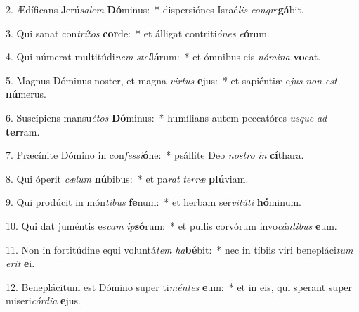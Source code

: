 2. Ædíficans Jerú\textit{sa}\textit{lem} \textbf{Dó}minus:~*  dispersiónes Israé\textit{lis} \textit{con}\textit{gre}\textbf{gá}bit.\

3. Qui sanat con\textit{trí}\textit{tos} \textbf{cor}de:~*  et álligat contriti\textit{ó}\textit{nes} \textit{e}\textbf{ó}rum.\

4. Qui númerat multitúdi\textit{nem} \textit{stel}\textbf{lá}rum:~*  et ómnibus eis \textit{nó}\textit{mi}\textit{na} \textbf{vo}cat.\

5. Magnus Dóminus noster, et magna \textit{vir}\textit{tus} \textbf{e}jus:~*  et sapiéntiæ e\textit{jus} \textit{non} \textit{est} \textbf{nú}merus.\

6. Suscípiens mansu\textit{é}\textit{tos} \textbf{Dó}minus:~*  humílians autem peccatóres \textit{us}\textit{que} \textit{ad} \textbf{ter}ram.\

7. Præcínite Dómino in con\textit{fes}\textit{si}\textbf{ó}ne:~*  psállite Deo \textit{nos}\textit{tro} \textit{in} \textbf{cí}thara.\

8. Qui óperit \textit{cæ}\textit{lum} \textbf{nú}bibus:~*  et pa\textit{rat} \textit{ter}\textit{ræ} \textbf{plú}viam.\

9. Qui prodúcit in món\textit{ti}\textit{bus} \textbf{fe}num:~*  et herbam ser\textit{vi}\textit{tú}\textit{ti} \textbf{hó}minum.\

10. Qui dat juméntis es\textit{cam} \textit{ip}\textbf{só}rum:~*  et pullis corvórum invo\textit{cán}\textit{ti}\textit{bus} \textbf{e}um.\

11. Non in fortitúdine equi voluntá\textit{tem} \textit{ha}\textbf{bé}bit:~*  nec in tíbiis viri benepláci\textit{tum} \textit{e}\textit{rit} \textbf{e}i.\

12. Beneplácitum est Dómino super ti\textit{mén}\textit{tes} \textbf{e}um:~*  et in eis, qui sperant super miseri\textit{cór}\textit{di}\textit{a} \textbf{e}jus.\


